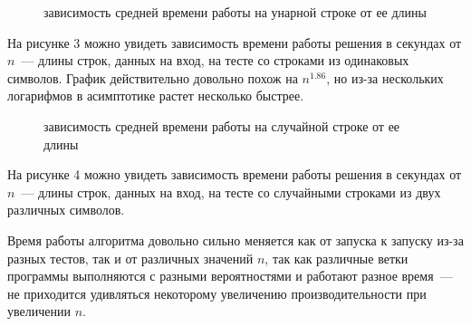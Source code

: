 \begin{figure}[h]
\caption{зависимость средней времени работы на унарной строке от ее длины}
\end{figure}

На рисунке 3 можно увидеть зависимость времени работы решения в секундах от $n$~--- длины строк, данных на вход, на тесте со строками из одинаковых символов. График действительно довольно похож на $n^{1.86}$, но из-за нескольких логарифмов в асимптотике растет несколько быстрее. 

\begin{figure}[h]
\caption{зависимость средней времени работы на случайной строке от ее длины}
\end{figure}

На рисунке 4 можно увидеть зависимость времени работы решения в секундах от $n$~--- длины строк, данных на вход, на тесте со случайными строками из двух различных символов.

Время работы алгоритма довольно сильно меняется как от запуска к запуску из-за разных тестов, так и от различных значений $n$, так как различные ветки программы выполняются с разными вероятностями и работают разное время~--- не приходится удивляться некоторому увеличению производительности при увеличении $n$.
